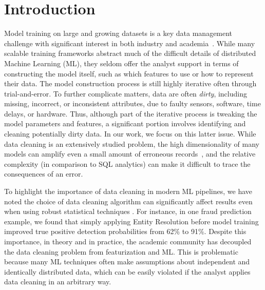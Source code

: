 \section{Introduction}\sloppy
Model training on large and growing datasets is a key data management challenge with significant interest in both industry and academia~\cite{bdas, alexandrov2014stratosphere, crotty2014tupleware, tensor}.
While many scalable training frameworks abstract much of the difficult details of distributed Machine Learning (ML), they seldom offer the analyst support in terms of constructing the model itself, such as which features to use or how to represent their data.
The model construction process is still highly iterative often through trial-and-error. 
To further complicate matters, data are often \emph{dirty}, including missing, incorrect, or inconsistent attributes, due to faulty sensors, software, time delays, or hardware.
Thus, although part of the iterative process is tweaking the model parameters and features, a significant portion involves identifying and cleaning potentially dirty data.  
In our work, we focus on this latter issue. 
While data cleaning is an extensively studied problem, the high dimensionality of many models can amplify even a small amount of erroneous records~\cite{xiaofeature}, and the relative complexity (in comparison to SQL analytics) can make it difficult to trace the consequences of an error.

To highlight the importance of data cleaning in modern ML pipelines, we have noted the choice of data cleaning algorithm can significantly affect results even when using robust statistical techniques \cite{activecleanarxiv, DBLP:conf/case/MahlerKLSMKPWFAG14}.
For instance, in one fraud prediction example, we found that simply applying Entity Resolution before model training improved true positive detection probabilities from 62\% to 91\%. 
Despite this importance, in theory and in practice, the academic community has decoupled the data cleaning problem from featurization and ML.
This is problematic because many ML techniques often make assumptions about independent and identically distributed data, which can be easily violated if the analyst applies data cleaning in an arbitrary way.

